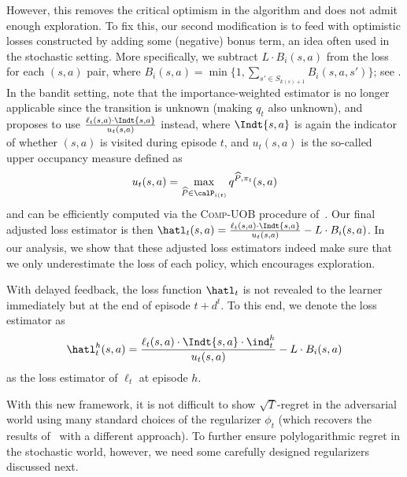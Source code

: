 However, this removes the critical optimism in the algorithm and does not admit enough exploration.
To fix this, our second modification is to feed \ftrl with optimistic losses constructed by adding some (negative) bonus term, an idea often used in the stochastic setting.
More specifically, we subtract $L \cdot B_i(s,a)$ from the loss for each $(s,a)$ pair, where $B_i(s,a) = \min\big\{1, \sum_{s' \in S_{k(s)+1}} B_i(s,a,s')\big\}$; see .
In the bandit setting, note that the importance-weighted estimator is no longer applicable since the transition is unknown (making $q_t$ also unknown), and~\citep{jin2019learning} proposes to use $\frac{\ell_t(s,a) \cdot \Indt{s,a}}{u_t(s,a)}$ instead, where $\Indt{s,a}$ is again the indicator of whether $(s,a)$ is visited during episode $t$, and $u_t(s,a)$ is the so-called upper occupancy measure defined as
\begin{equation}\label{eq:UOB}
u_t(s,a) = \max_{\widehat{P} \in \calP_{i(t)}} q^{\widehat{P}, \pi_t}(s,a)
\end{equation}
and can be efficiently computed via the \textsc{Comp-UOB} procedure of~\citep{jin2019learning}.
Our final adjusted loss estimator is then $\hatl_t(s,a) = \frac{\ell_t(s,a) \cdot \Indt{s,a} }{u_t(s,a)}   - L \cdot B_{i}(s,a)$.
In our analysis, we show that these adjusted loss estimators indeed make sure that we only underestimate the loss of each policy, which encourages exploration.

{\color{magenta}
With delayed feedback, the loss function $\hatl_t$ is not revealed to the learner immediately but at the end of episode $t+d^t$. To this end, we denote the loss estimator  as 
\begin{align*}
\hatl_t^h(s,a) =   \frac{\ell_t(s,a) \cdot \Indt{s,a} \cdot \ind_t^h }{u_t(s,a)}   - L \cdot B_{i}(s,a)
\end{align*}
as the loss estimator of $\ell_t$ at episode $h$. 
}

With this new framework, it is not difficult to show $\sqrt{T}$-regret in the adversarial world using many standard choices of the regularizer $\phi_t$ (which recovers the results of~\citep{rosenberg19a, jin2019learning} with a different approach).
To further ensure polylogarithmic regret in the stochastic world, however, we need some carefully designed regularizers discussed next.

